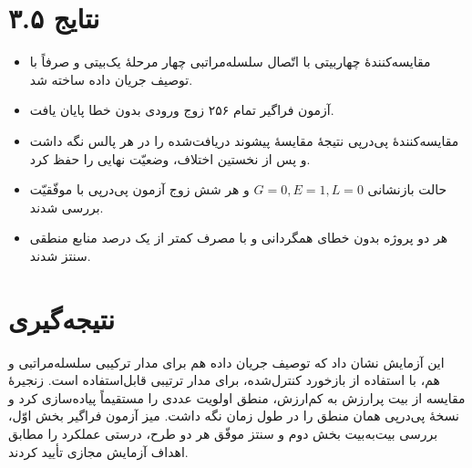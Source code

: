 \documentclass[12pt,a4paper]{article}
\begin{document}

	\section*{۳.۵ نتایج}
	\begin{itemize}
		\item مقایسه‌کنندهٔ چهاربیتی با اتّصال سلسله‌مراتبی چهار مرحلهٔ یک‌بیتی و صرفاً با توصیف جریان داده ساخته شد.
		\item آزمون فراگیر تمام ۲۵۶ زوج ورودی بدون خطا پایان یافت.
		\item مقایسه‌کنندهٔ پی‌درپی نتیجهٔ مقایسهٔ پیشوند دریافت‌شده را در هر پالس نگه داشت و پس از نخستین اختلاف، وضعیّت نهایی را حفظ کرد.
		\item حالت بازنشانی \(G=0,E=1,L=0\) و هر شش زوج آزمون پی‌درپی با موفّقیّت بررسی شدند.
		\item هر دو پروژه بدون خطای همگردانی و با مصرف کمتر از یک درصد منابع منطقی سنتز شدند.
	\end{itemize}

	\section*{نتیجه‌گیری}
	این آزمایش نشان داد که توصیف جریان داده هم برای مدار ترکیبی سلسله‌مراتبی و هم، با استفاده از بازخورد کنترل‌شده، برای مدار ترتیبی قابل‌استفاده است. زنجیرهٔ مقایسه از بیت پرارزش به کم‌ارزش، منطق اولویت عددی را مستقیماً پیاده‌سازی کرد و نسخهٔ پی‌درپی همان منطق را در طول زمان نگه داشت. میز آزمون فراگیر بخش اوّل، بررسی بیت‌به‌بیت بخش دوم و سنتز موفّق هر دو طرح، درستی عملکرد را مطابق اهداف آزمایش مجازی تأیید کردند.
\end{document}
